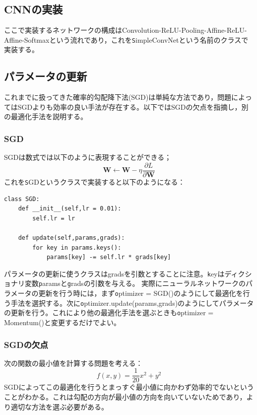 \documentclass{jarticle}
\begin{document}
\subsection{CNNの実装}
ここで実装するネットワークの構成はConvolution-ReLU-Pooling-Affine-ReLU-Affine-Softmaxという流れであり，これを{\texttt SimpleConvNet}という名前のクラスで実装する。

\subsection{パラメータの更新}
これまでに扱ってきた確率的勾配降下法(SGD)は単純な方法であり，問題によってはSGDよりも効率の良い手法が存在する。以下ではSGDの欠点を指摘し，別の最適化手法を説明する。
\setcounter{subsubsection}{1}
\subsubsection{SGD}
SGDは数式では以下のように表現することができる；
\[
\bm{W} \leftarrow \bm{W}-\eta \dfrac{\partial L}{\partial \bm{W}}
\]
これを{\texttt SGD}というクラスで実装すると以下のようになる：
\begin{lstlisting}
class SGD:
	def __init__(self,lr = 0.01):
		self.lr = lr
		
	def update(self,params,grads):
		for key in params.keys():
			params[key] -= self.lr * grads[key]
\end{lstlisting}
パラメータの更新に使うクラスは{\text grads}を引数とすることに注意。{\texttt key}はディクショナリ変数{\texttt params}と{\texttt grads}の引数を与える。
実際にニューラルネットワークのパラメータの更新を行う時には，まず{\texttt optimizer = SGD()}のようにして最適化を行う手法を選択する。次に{\texttt optimizer.update(params,grads)}のようにしてパラメータの更新を行う。これにより他の最適化手法を選ぶときも{\texttt optimizer = Momentum()}と変更するだけでよい。

\subsubsection{SGDの欠点}
次の関数の最小値を計算する問題を考える：
\[
f(x,y) = \dfrac{1}{20} x^2 + y^2
\]
SGDによってこの最適化を行うとまっすぐ最小値に向かわず効率的でないということがわかる。これは勾配の方向が最小値の方向を向いていないためであり，より適切な方法を選ぶ必要がある。
\end{document}
